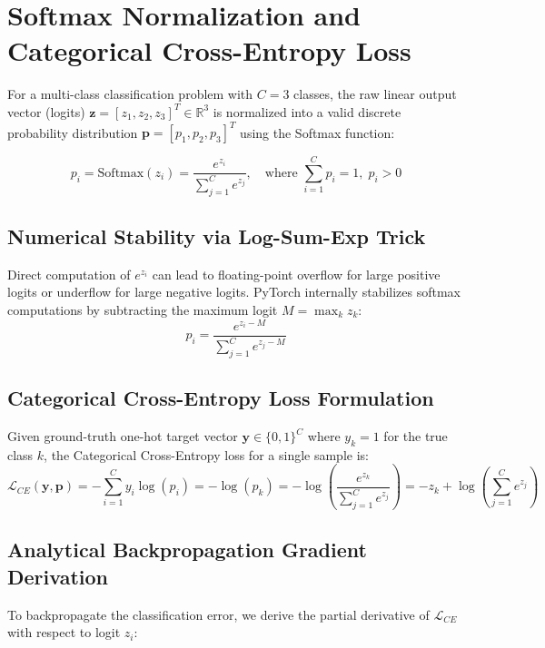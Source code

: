 \documentclass[11pt,a4paper,oneside]{report}
\begin{document}
\section{Softmax Normalization and Categorical Cross-Entropy Loss}
For a multi-class classification problem with $C=3$ classes, the raw linear output vector (logits) $\mathbf{z} = [z_1, z_2, z_3]^T \in \mathbb{R}^3$ is normalized into a valid discrete probability distribution $\mathbf{p} = [p_1, p_2, p_3]^T$ using the Softmax function:

\begin{equation}
    p_i = \text{Softmax}(z_i) = \frac{e^{z_i}}{\sum_{j=1}^{C} e^{z_j}}, \quad \text{where } \sum_{i=1}^{C} p_i = 1, \; p_i > 0
\end{equation}

\subsection{Numerical Stability via Log-Sum-Exp Trick}
Direct computation of $e^{z_i}$ can lead to floating-point overflow for large positive logits or underflow for large negative logits. PyTorch internally stabilizes softmax computations by subtracting the maximum logit $M = \max_k z_k$:
\begin{equation}
    p_i = \frac{e^{z_i - M}}{\sum_{j=1}^{C} e^{z_j - M}}
\end{equation}

\subsection{Categorical Cross-Entropy Loss Formulation}
Given ground-truth one-hot target vector $\mathbf{y} \in \{0, 1\}^C$ where $y_k = 1$ for the true class $k$, the Categorical Cross-Entropy loss for a single sample is:
\begin{equation}
    \mathcal{L}_{CE}(\mathbf{y}, \mathbf{p}) = -\sum_{i=1}^{C} y_i \log(p_i) = -\log(p_k) = -\log\left(\frac{e^{z_k}}{\sum_{j=1}^{C} e^{z_j}}\right) = -z_k + \log\left(\sum_{j=1}^{C} e^{z_j}\right)
\end{equation}

\subsection{Analytical Backpropagation Gradient Derivation}
To backpropagate the classification error, we derive the partial derivative of $\mathcal{L}_{CE}$ with respect to logit $z_i$:
\end{document}

